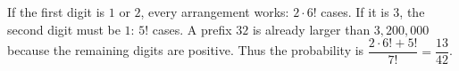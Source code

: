 If the first digit is $1$ or $2$, every arrangement works: $2\cdot6!$ cases. If it is $3$, the second digit must be $1$: $5!$ cases. A prefix $32$ is already larger than $3{,}200{,}000$ because the remaining digits are positive. Thus the probability is $\dfrac{2\cdot6!+5!}{7!}=\boxed{\dfrac{13}{42}}$.
